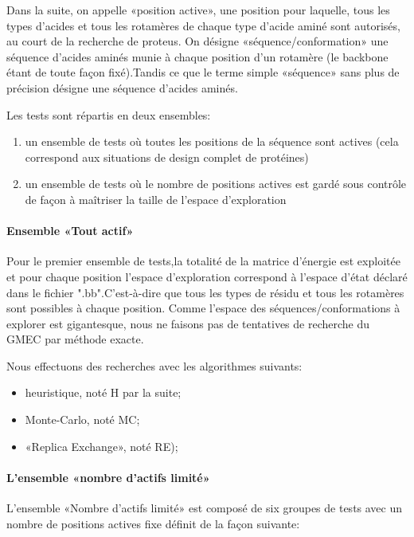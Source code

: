 Dans la suite, on appelle «position active», une position pour laquelle, tous les types d'acides et tous les rotamères de chaque type d'acide aminé sont autorisés, au court de la recherche de proteus. On désigne «séquence/conformation» une séquence d'acides aminés munie à chaque position d'un rotamère (le backbone étant de toute façon fixé).Tandis ce que le terme simple «séquence»  sans plus de précision désigne une séquence d'acides aminés.

\label{sec:description_tests}
Les tests sont répartis en deux ensembles:
\begin{enumerate}
\item un ensemble de tests où toutes les positions de la séquence sont actives (cela correspond aux situations de design complet de protéines) 
\item un ensemble de tests où le nombre de positions actives est gardé sous contrôle de façon à maîtriser la taille de l'espace d'exploration
\end{enumerate}


\paragraph{Ensemble «Tout actif»}
\label{methode_TTactif}
Pour le premier ensemble de tests,la totalité de la matrice d'énergie est exploitée et pour chaque position l'espace d'exploration correspond à l'espace d'état déclaré dans le fichier ".bb".C'est-à-dire que tous les types de résidu et tous les rotamères sont possibles à chaque position.
Comme l'espace des séquences/conformations à explorer est gigantesque, nous ne faisons pas de tentatives de recherche du GMEC  par méthode exacte. 

Nous effectuons des recherches avec les algorithmes suivants:

\begin{itemize}
\item heuristique, noté H par la suite;
\item Monte-Carlo, noté MC;
\item «Replica Exchange», noté RE);
\end{itemize}


\paragraph{L'ensemble «nombre d'actifs limité»}

L'ensemble «Nombre d'actifs limité» est composé de six groupes de tests avec un nombre de positions actives fixe définit de la façon suivante:  


